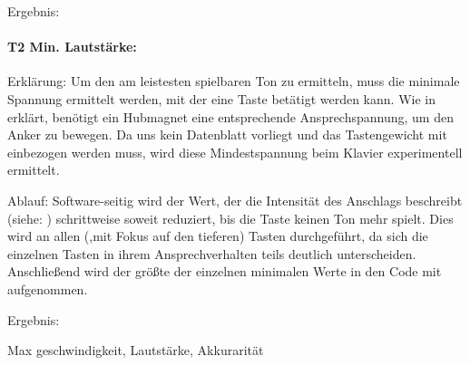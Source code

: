 Ergebnis:

\paragraph{T2 Min. Lautstärke:}
Erklärung: Um den am leistesten spielbaren Ton zu ermitteln, muss die minimale Spannung ermittelt werden, mit der eine Taste betätigt werden kann.
Wie in  erklärt, benötigt ein Hubmagnet eine entsprechende Ansprechspannung, um den Anker zu bewegen.
Da uns kein Datenblatt vorliegt und das Tastengewicht mit einbezogen werden muss, wird diese Mindestspannung beim Klavier experimentell ermittelt.

Ablauf: Software-seitig wird der Wert, der die Intensität des Anschlags beschreibt (siehe: ) schrittweise soweit reduziert, bis die Taste keinen Ton mehr spielt.
Dies wird an allen (,mit Fokus auf den tieferen) Tasten durchgeführt, da sich die einzelnen Tasten in ihrem Ansprechverhalten teils deutlich unterscheiden.
Anschließend wird der größte der einzelnen minimalen Werte in den Code mit aufgenommen.

Ergebnis:


Max geschwindigkeit, Lautstärke, Akkurarität